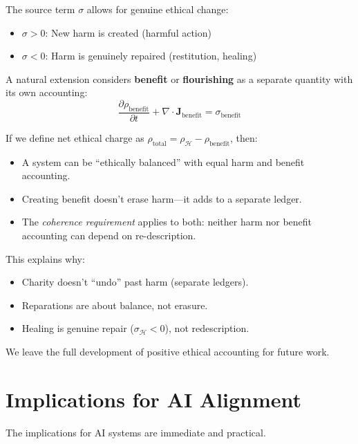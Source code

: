 \documentclass[12pt,letterpaper]{article}
\theoremstyle{definition}
\theoremstyle{remark}
\newcommand{\harm}{\mathcal{H}}
\begin{document}
The source term $\sigma$ allows for genuine ethical change:

\begin{itemize}
    \item $\sigma > 0$: New harm is created (harmful action)
    \item $\sigma < 0$: Harm is genuinely repaired (restitution, healing)
\end{itemize}

A natural extension considers \textbf{benefit} or \textbf{flourishing} as a separate quantity with its own accounting:
\begin{equation}
\frac{\partial \rho_{\text{benefit}}}{\partial t} + \nabla \cdot \mathbf{J}_{\text{benefit}} = \sigma_{\text{benefit}}
\end{equation}

If we define net ethical charge as $\rho_{\text{total}} = \rho_\harm - \rho_{\text{benefit}}$, then:
\begin{itemize}
    \item A system can be ``ethically balanced'' with equal harm and benefit accounting.
    \item Creating benefit doesn't erase harm---it adds to a separate ledger.
    \item The \textit{coherence requirement} applies to both: neither harm nor benefit accounting can depend on re-description.
\end{itemize}

This explains why:
\begin{itemize}
    \item Charity doesn't ``undo'' past harm (separate ledgers).
    \item Reparations are about balance, not erasure.
    \item Healing is genuine repair ($\sigma_\harm < 0$), not redescription.
\end{itemize}

We leave the full development of positive ethical accounting for future work.

\section{Implications for AI Alignment}

The implications for AI systems are immediate and practical.
\end{document}
